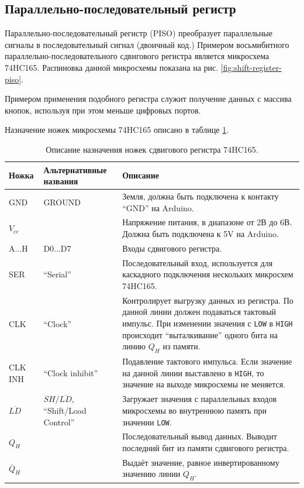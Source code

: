 \documentclass[../sparc.tex]{subfiles}
\begin{document}
\subsection{Параллельно-последовательный регистр}

Параллельно-последовательный регистр (\gls{PISO}) преобразует параллельные
сигналы в последовательный сигнал (двоичный код.) Примером восьмибитного
параллельно-последовательного сдвигового регистра является микросхема
74HC165\cite{ti:sn74hc165}.  Распиновка данной микросхемы показана на рис.
\ref{fig:shift-register-piso}.


Примером применения подобного регистра служит получение данных с массива кнопок,
используя при этом меньше цифровых портов.

Назначение ножек микросхемы 74HC165 описано в таблице
\ref{table:shift-register-piso-pins}.

\begin{table}[H]
  \centering
  \small
  \begin{tabular}{ | m{1.2cm} | m{2.55cm} | m{6.75cm} | }
    \hline
    \textbf{Ножка}
    & \textbf{Альтернативные названия}
    & \textbf{Описание} \\
    \hline
    GND
    & GROUND
    & Земля, должна быть подключена к контакту ``GND'' на Arduino. \\
    \hline
    $V_{cc}$
    &
    & Напряжение питания, в диапазоне от 2В до 6В.
    Должна быть подключена к 5V на Arduino. \\
    \hline
    A...H
    & D0...D7
    & Входы сдвигового регистра. \\
    \hline
    SER
    & ``Serial''
    & Последовательный вход, используется для каскадного подключения
    нескольких микросхем 74HC165. \\
    \hline
    CLK
    & ``Clock''
    & Контролирует выгрузку данных из регистра.  По данной линии должен
    подаваться тактовый импульс.  При изменении значения с \texttt{LOW} в
    \texttt{HIGH} происходит ``выталкивание'' одного бита на линию $Q_H$
    из памяти. \\
    \hline
    CLK INH
    & ``Clock inhibit''
    & Подавление тактового импульса.  Если значение на данной линии
    выставлено в \texttt{HIGH}, то значение на выходе микросхемы
    не меняется. \\
    \hline
    $\overline{LD}$
    & $SH/\overline{LD}$, ``Shift/Load Control''
    & Загружает значения с параллельных входов микросхемы во внутреннюю
    память при значении \texttt{LOW}. \\
    \hline
    $Q_H$
    &
    & Последовательный вывод данных.  Выводит последний бит из памяти
    сдвигового регистра. \\
    \hline
    $\overline{Q}_H$
    &
    & Выдаёт значение, равное инвертированному значению линии $Q_H$. \\
    \hline
  \end{tabular}
  \caption{Описание назначения ножек сдвигового регистра 74HC165.}
  \label{table:shift-register-piso-pins}
\end{table}
\end{document}
